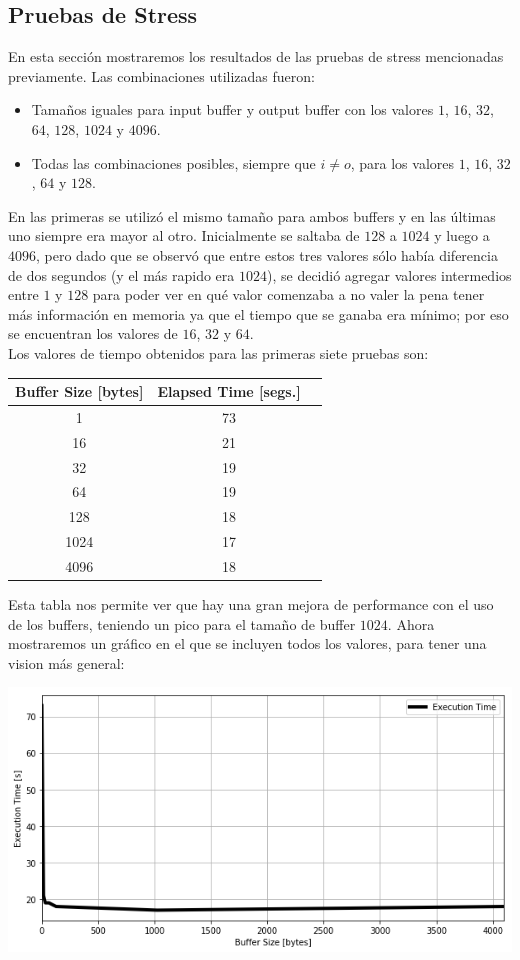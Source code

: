\documentclass[a4paper, 10pt]{article}
\newcommand\tab[1][0.5cm]{\hspace*{#1}}
\begin{document}
		\subsection{Pruebas de Stress}
			En esta sección mostraremos los resultados de las pruebas de stress mencionadas previamente. Las combinaciones utilizadas
			fueron: \\
			\begin{itemize}
				\item Tamaños iguales para input buffer y output buffer con los valores $1$, $16$, $32$, $64$, $128$, $1024$ y $4096$.
				\item Todas las combinaciones posibles, siempre que $i \neq o$, para los valores $1$, $16$, $32$, $64$ y $128$.
			\end{itemize}
			\tab En las primeras se utilizó el mismo tamaño para ambos buffers y en las últimas uno siempre era mayor al otro.
			Inicialmente se saltaba de $128$ a $1024$ y luego a $4096$, pero dado que se observó que entre estos tres valores sólo
			había diferencia de dos segundos (y el más rapido era $1024$), se decidió agregar valores intermedios entre $1$ y $128$
			para poder ver en qué valor comenzaba a no valer la pena tener más información en memoria ya que el tiempo que se ganaba
			era mínimo; por eso se encuentran los valores de $16$, $32$ y $64$. \\
			\tab Los valores de tiempo obtenidos para las primeras siete pruebas son:
			\begin{center}
				\begin{tabular}{ | c | c | c | }
					\hline
					Buffer Size [bytes] & Elapsed Time [segs.]\\
					\hline
 					1 & 73 \\
 					16 & 21 \\
 					32 & 19 \\
 					64 & 19 \\
 					128 & 18 \\
 					1024 & 17 \\
 					4096 & 18 \\
 					\hline			
				\end{tabular}
			\end{center}
			\tab Esta tabla nos permite ver que hay una gran mejora de performance con el uso de los buffers, teniendo un pico para
			el tamaño de buffer $1024$. Ahora mostraremos un gráfico en el que se incluyen todos los valores, para tener una 
			vision más general:
			\begin{center}
		       \includegraphics[width=\textwidth]{images/stressEquals}
    			\end{center}
\end{document}
